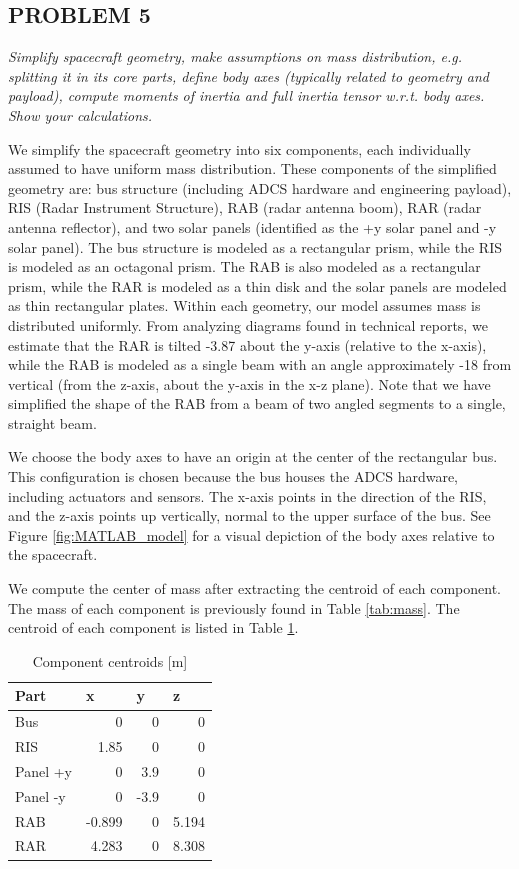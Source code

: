 \subsection{PROBLEM 5}
\textit{Simplify spacecraft geometry, make assumptions on mass distribution, e.g. splitting it in its core parts, define body axes (typically related to geometry and payload), compute moments of inertia and full inertia tensor w.r.t. body axes. Show your calculations.}

We simplify the spacecraft geometry into six components, each individually assumed to have uniform mass distribution. These components of the simplified geometry are: bus structure (including ADCS hardware and engineering payload), RIS (Radar Instrument Structure), RAB (radar antenna boom), RAR (radar antenna reflector), and two solar panels (identified as the +y solar panel and -y solar panel). The bus structure is modeled as a rectangular prism, while the RIS is modeled as an octagonal prism. The RAB is also modeled as a rectangular prism, while the RAR is modeled as a thin disk and the solar panels are modeled as thin rectangular plates. Within each geometry, our model assumes mass is distributed uniformly. From analyzing diagrams found in technical reports, we estimate that the RAR is tilted -3.87\degree{} about the y-axis (relative to the x-axis), while the RAB is modeled as a single beam with an angle approximately -18\degree{} from vertical (from the z-axis, about the y-axis in the x-z plane). Note that we have simplified the shape of the RAB from a beam of two angled segments to a single, straight beam.

We choose the body axes to have an origin at the center of the rectangular bus. This configuration is chosen because the bus houses the ADCS hardware, including actuators and sensors. The x-axis points in the direction of the RIS, and the z-axis points up vertically, normal to the upper surface of the bus. See Figure \ref{fig:MATLAB_model} for a visual depiction of the body axes relative to the spacecraft.

We compute the center of mass after extracting the centroid of each component. The mass of each component is previously found in Table \ref{tab:mass}. The centroid of each component is listed in Table \ref{tab:centroid}.

\begin{longtable}{l|r|r|r}
\caption{Component centroids [m]}
\label{tab:centroid}\\
\textbf{Part} & \multicolumn{1}{l}{\textbf{x}} & \multicolumn{1}{l}{\textbf{y}} & \multicolumn{1}{l}{\textbf{z}} \\ \hline
\endfirsthead
%
\endhead
%
Bus      & 0     & 0    & 0    \\
RIS      & 1.85  & 0    & 0    \\
Panel +y & 0     & 3.9  & 0    \\
Panel -y & 0     & -3.9 & 0    \\
RAB      & -0.899 & 0    & 5.194 \\
RAR      & 4.283   & 0    & 8.308
\end{longtable}

